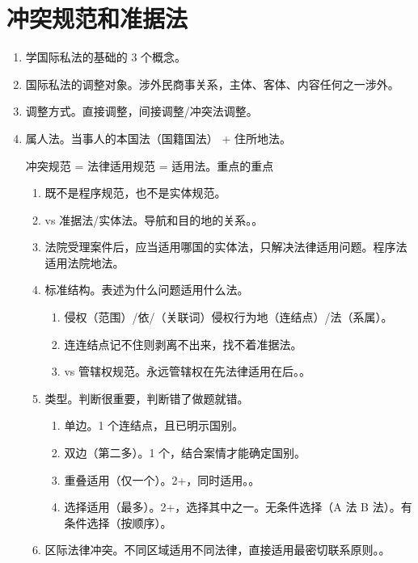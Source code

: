 \section{冲突规范和准据法}
\begin{enumerate}
  \item 学国际私法的基础的 3 个概念。
  \item 国际私法的调整对象。涉外民商事关系，主体、客体、内容任何之一涉外。
  \item 调整方式。直接调整，间接调整/冲突法调整。
  \item 属人法。当事人的本国法（国籍国法） + 住所地法。
        \begin{kk}{冲突规范 = 法律适用规范 = 适用法。重点的重点}
          \begin{enumerate}
            \item 既不是程序规范，也不是实体规范。
            \item vs 准据法/实体法。导航和目的地的关系。。
            \item 法院受理案件后，应当适用哪国的实体法，只解决法律适用问题。程序法适用法院地法。
            \item 标准结构。表述为什么问题适用什么法。
                  \begin{enumerate}
                    \item 侵权（范围）/依/（关联词）侵权行为地（连结点）/法（系属）。
                    \item 连连结点记不住则剥离不出来，找不着准据法。
                    \item vs 管辖权规范。永远管辖权在先法律适用在后。。
                  \end{enumerate}
            \item 类型。判断很重要，判断错了做题就错。
                  \begin{enumerate}
                    \item 单边。1 个连结点，且已明示国别。
                    \item 双边（第二多）。1 个，结合案情才能确定国别。
                    \item 重叠适用（仅一个）。2+，同时适用。。
                    \item 选择适用（最多）。2+，选择其中之一。无条件选择（A 法 \hz B 法）。有条件选择（按顺序）。
                  \end{enumerate}
            \item 区际法律冲突。不同区域适用不同法律，直接适用最密切联系原则。。
          \end{enumerate}
        \end{kk}
\end{enumerate}
